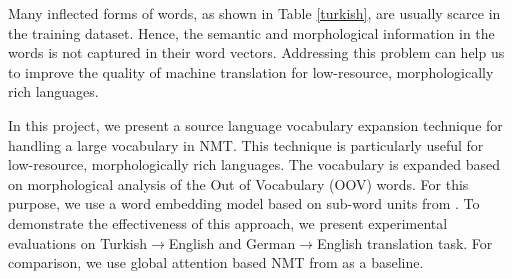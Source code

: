 Many inflected forms of words, as shown in Table \ref{turkish}, are usually scarce in the training dataset. Hence, the semantic and morphological information in the words is not captured in their word vectors. Addressing this problem can help us to improve the quality of machine translation for low-resource, morphologically rich languages.


In this project, we present a source language vocabulary expansion technique for handling a large vocabulary in NMT. This technique is particularly useful for low-resource, morphologically rich languages. The vocabulary is expanded based on morphological analysis of the Out of Vocabulary (OOV) words. For this purpose, we use a word embedding model based on sub-word units from \cite{bojanowski2016enriching}. To demonstrate the effectiveness of this approach, we present experimental evaluations on Turkish$\rightarrow$English and German$\rightarrow$English translation task. For comparison, we use global attention based NMT from \cite{luong2015effective} as a baseline.




%


